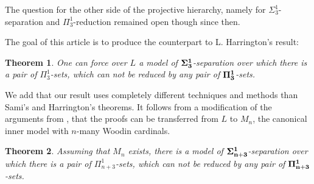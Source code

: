 \documentclass[a4paper,11pt]{article}
\newtheorem*{theorem*}{Theorem}
\begin{document}
The question for the other side of the projective hierarchy, namely for $\Sigma^1_3$-separation and $\Pi^1_3$-reduction remained open though since then. 


The goal of this article is to produce the counterpart to L. Harrington's result:
\begin{theorem*}
One can force over $L$ a model of $\bf{\Sigma}^1_3$-separation over which there is a pair of $\Pi^1_3$-sets, which can not be reduced by any pair of $\bf{\Pi}^1_3$-sets.
\end{theorem*}
We add that our result uses completely different techniques and methods than Sami's and Harrington's theorems.
It follows from a modification of the arguments from \cite{Ho2}, that the proofs can be transferred from $L$ to $M_n$, the canonical inner model with $n$-many Woodin cardinals.

\begin{theorem*}
Assuming that $M_n$ exists, there is a model of $\bf{\Sigma}^1_{n+3}$-separation over which there is a pair of $\Pi^1_{n+3}$-sets, which can not be reduced by any pair of $\bf{\Pi}^1_{n+3}$-sets.

\end{theorem*}
\end{document}
